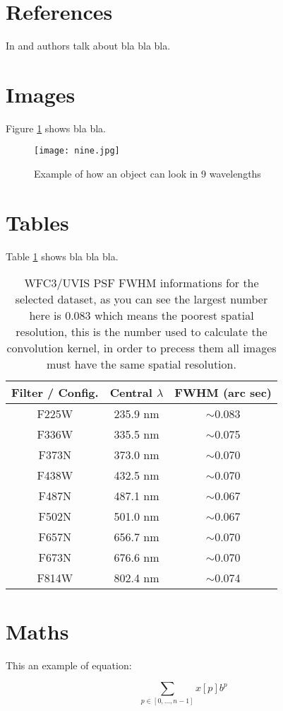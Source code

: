\section{References}
In \cite{book_key} and \cite{article_key} authors talk about bla bla bla.

\section{Images}
Figure \ref{fig:nine} shows bla bla. 

\begin{figure}[t]   %
	\centering
    \texttt{[image: nine.jpg]}
    \caption{Example of how an object can look in 9 wavelengths}
    \label{fig:nine}
\end{figure}

\section{Tables}
Table \ref{tab:dos} shows bla bla bla.

\begin{table}[t]
    \centering
    \caption{WFC3/UVIS PSF FWHM informations for the selected dataset, as you can see the largest number here is 0.083 
    which means the poorest spatial resolution, this is the number used to calculate the convolution kernel, in order to 
    precess them all images must have the same spatial resolution.}
    \label{tab:dos}
      \begin{tabular}{ c c c }
      \hline\hline
      Filter / Config. & Central $\lambda$ & FWHM (arc sec)\\
      \hline
      F225W & 235.9 nm & $\sim$0.083\\      
      F336W & 335.5 nm & $\sim$0.075\\      
      F373N & 373.0 nm & $\sim$0.070\\
      F438W & 432.5 nm & $\sim$0.070\\
      F487N & 487.1 nm & $\sim$0.067\\
      F502N & 501.0 nm & $\sim$0.067\\
      F657N & 656.7 nm & $\sim$0.070\\
      F673N & 676.6 nm & $\sim$0.070\\
      F814W & 802.4 nm & $\sim$0.074\\    
      \hline
    \end{tabular}
  \end{table}
  

\section{Maths}
This an example of equation:

\begin{equation}
  \sum_{p\in [0,\ldots,n-1]} x[p] b^p
\end{equation}

